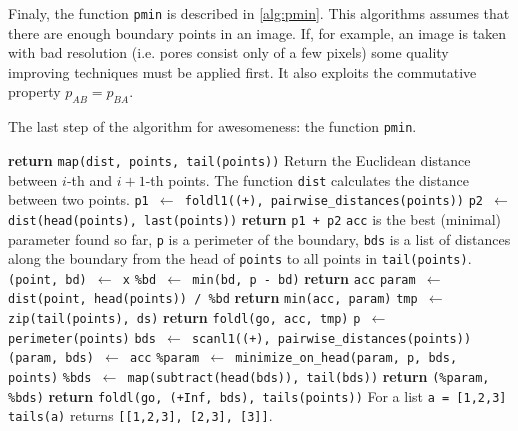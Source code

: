 \documentclass[reprint,amsmath,amssymb,aps,pre,showkeys,showpacs]{revtex4-1}
\begin{document}
Finaly, the function \texttt{pmin} is described in \cref{alg:pmin}. This
algorithms assumes that there are enough boundary points in an image. If, for
example, an image is taken with bad resolution (i.e. pores consist only of a few
pixels) some quality improving techniques must be applied first. It also
exploits the commutative property $p_{AB} = p_{BA}$.
\begin{algorithm}[H]
  \caption{The last step of the algorithm for awesomeness: the function \texttt{pmin}.}
  \label{alg:pmin}
  \begin{algorithmic}[1]
    \State \textbf{return} \texttt{map(dist, points, tail(points))}
    \Comment Return the Euclidean distance between $i$-th and $i+1$-th
    points. The function \texttt{dist} calculates the distance between two
    points.
    \EndProcedure
    \State \texttt{p1 $\gets$ foldl1((+), pairwise\_distances(points))}
    \State \texttt{p2 $\gets$ dist(head(points), last(points))}
    \State \textbf{return} \texttt{p1 + p2}
    \EndProcedure
    \Comment \texttt{acc} is the best (minimal) parameter found so far,
    \texttt{p} is a perimeter of the boundary, \texttt{bds} is a list of
    distances along the boundary from the head of \texttt{points} to all points
    in \texttt{tail(points)}.
    \State \texttt{(point, bd) $\gets$ x}
    \State \texttt{\%bd $\gets$ min(bd, p - bd)}
    \State \textbf{return} \texttt{acc}
    \Else
    \State \texttt{param $\gets$ dist(point, head(points)) / \%bd}
    \State \textbf{return} \texttt{min(acc, param)}
    \EndIf
    \EndProcedure
    \State \texttt{tmp $\gets$ zip(tail(points), ds)}
    \State \textbf{return} \texttt{foldl(go, acc, tmp)}
    \EndProcedure
    \State \texttt{p $\gets$ perimeter(points)}
    \State \texttt{bds $\gets$ scanl1((+), pairwise\_distances(points))}
    \State \texttt{(param, bds) $\gets$ acc}
    \State \texttt{\%param $\gets$ minimize\_on\_head(param, p, bds, points)}
    \State \texttt{\%bds  $\gets$ map(subtract(head(bds)), tail(bds))}
    \State \textbf{return} \texttt{(\%param, \%bds)}
    \EndProcedure
    \State \textbf{return} \texttt{foldl(go, (+Inf, bds), tails(points))}
    \Comment For a list \texttt{a = [1,2,3]} \texttt{tails(a)} returns
    \texttt{[[1,2,3], [2,3], [3]]}.
    \EndProcedure
  \end{algorithmic}
\end{algorithm}
\end{document}
